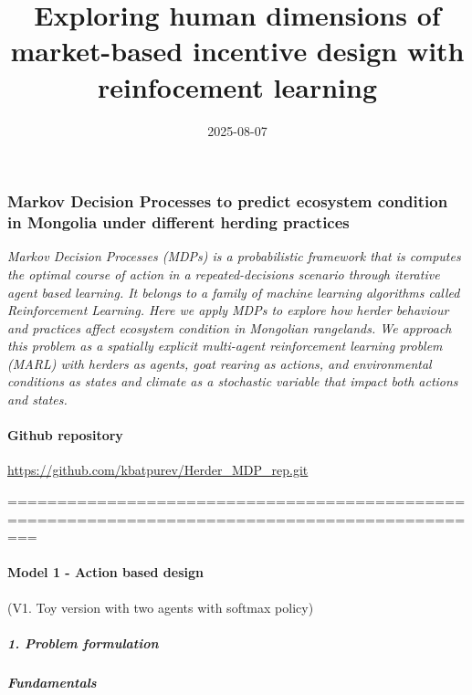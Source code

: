 \documentclass[
]{article}
\title{Exploring human dimensions of market-based incentive design with
reinfocement learning}
\author{}
\date{\vspace{-2.5em}2025-08-07}
\begin{document}
\maketitle

\hypertarget{markov-decision-processes-to-predict-ecosystem-condition-in-mongolia-under-different-herding-practices}{%
\subsubsection{Markov Decision Processes to predict ecosystem condition
in Mongolia under different herding
practices}\label{markov-decision-processes-to-predict-ecosystem-condition-in-mongolia-under-different-herding-practices}}

\emph{Markov Decision Processes (MDPs) is a probabilistic framework that
is computes the optimal course of action in a repeated-decisions
scenario through iterative agent based learning. It belongs to a family
of machine learning algorithms called Reinforcement Learning. Here we
apply MDPs to explore how herder behaviour and practices affect
ecosystem condition in Mongolian rangelands. We approach this problem as
a spatially explicit multi-agent reinforcement learning problem (MARL)
with herders as agents, goat rearing as actions, and environmental
conditions as states and climate as a stochastic variable that impact
both actions and states.}

\hypertarget{github-repository}{%
\paragraph{Github repository}\label{github-repository}}

\url{https://github.com/kbatpurev/Herder_MDP_rep.git}

===============================================================================================

\hypertarget{model-1---action-based-design}{%
\paragraph{Model 1 - Action based
design}\label{model-1---action-based-design}}

(V1. Toy version with two agents with softmax policy)

\hypertarget{problem-formulation}{%
\subparagraph{\texorpdfstring{\textbf{1. Problem
formulation}}{1. Problem formulation}}\label{problem-formulation}}

\hypertarget{fundamentals}{%
\subparagraph{Fundamentals}\label{fundamentals}}
\end{document}
